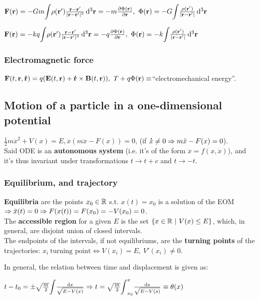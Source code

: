 $\vec{F}(\vec{r})=-Gm\scaleint{5ex}\rho(\vec{r}')\frac{\vec{r}-\vec{r}'}{|\vec{r}-\vec{r}'|^{3}}\dd[3]{\vec{r}}=-m\partials{\Phi(\vec{r})}{\vec{r}},\ \Phi(\vec{r})=-G\scaleint{5ex}\frac{\rho(\vec{r'})}{|\vec{r}-\vec{r}'|}\dd[3]{\vec{r}}$

$\vec{F}(\vec{r})=-kq\scaleint{5ex}\rho(\vec{r}')\frac{\vec{r}-\vec{r}'}{|\vec{r}-\vec{r}'|^{3}}\dd[3]{\vec{r}}=-q\partials{\Phi(\vec{r})}{\vec{r}},\ \Phi(\vec{r})=-k\scaleint{5ex}\frac{\rho(\vec{r'})}{|\vec{r}-\vec{r}'|}\dd[3]{\vec{r}}$



\subsubsection*{Electromagnetic force}
$\vec{F}(t,\vec{r},\dotv{r})=q(\vec{E}(t,\vec{r})+\dotv{r}\times\vec{B}(t,\vec{r})),\ T+q\Phi(\vec{r})\equiv$``electromechanical energy''.




\subsection{Motion of a particle in a one-dimensional potential}
$\frac{1}{2}m\dot{x}^{2}+V(x)=E, \dot{x}(m\ddot{x}-F(x))=0$, (if $\accentset{\mbox{\bfseries .}}{x}\neq0\Rightarrow m\ddot{x}-F(x)=0$).\\
Said ODE is an \textbf{autonomous system} (i.e. it's of the form $\ddot{x}=f(x,\dot{x})$), and it's thus invariant under transformations $t\to t+c$ and $t\to -t$.

\subsubsection*{Equilibrium, and trajectory}
\textbf{Equilibria} are the points $x_{0}\in\mathbb{R}$ s.t. $x(t)=x_{0}$ is a solution of the EOM $\Rightarrow \ddot{x}(t)=0\Rightarrow F(x(t))=F(x_{0})=-V(x_{0})=0$.\\
The \textbf{accessible region} for a given $E$ is the set $\{x\in\mathbb{R}\ |\ V(x)\leq E\}$, which, in general, are disjoint union of closed intervals.\\
The endpoints of the intervals, if not equilibriums, are the \textbf{turning points} of the trajectories: $x_{i} \ \text{turning point} \iff V(x_{i})=E,\ V'(x_{i})\neq0$.
\smallskip


In general, the relation between time and displacement is given as: \\
\centerline{$t-t_{0}=\pm\sqrt{\frac{m}{2}}\scaleint{5ex}\frac{\dd{x}}{\sqrt{E-V(x)}}\then t=\sqrt{\frac{m}{2}}\scaleint{5ex}
_{x_{0}}^{x}\frac{\dd{s}}{\sqrt{E-V(s)}}\equiv \theta(x)$}

